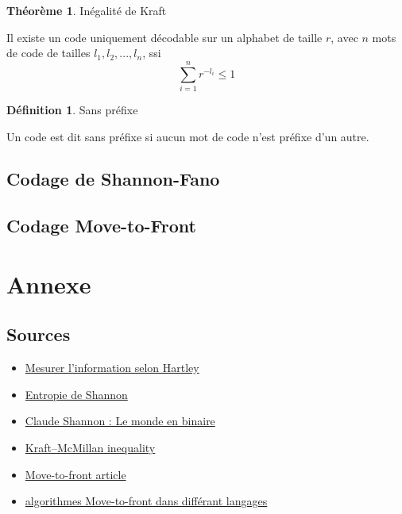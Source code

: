 \documentclass[10pt,a4paper]{article}
\theoremstyle{definition}
\newtheorem{theorem}{Théorème}
\newtheorem{definition}{Définition}
\numberwithin{lemma}{subsection}
\numberwithin{theorem}{subsection}
\numberwithin{definition}{subsection}
\numberwithin{proposition}{subsection}
\numberwithin{corollary}{subsection}
\numberwithin{property}{subsection}
\numberwithin{example}{subsection}
\numberwithin{heuristique}{subsection}
\numberwithin{scenario}{subsection}
\begin{document}
\begin{theorem}{Inégalité de Kraft}
\par Il existe un code uniquement décodable sur un alphabet de taille $r$, avec $n$ mots de code de tailles $l_1, l_2, ..., l_n$, ssi $$\sum_{i=1}^n r^{-l_i} \leqslant 1$$
\end{theorem}

\begin{definition}{Sans préfixe}
\par Un code est dit sans préfixe si aucun mot de code n'est préfixe d'un autre.
\end{definition}

	\subsection{Codage de Shannon-Fano}
	
	\subsection{Codage Move-to-Front}
	
	    

\section*{Annexe}
\subsection*{Sources}
\begin{itemize}
\item \href{https://www.sciencepresse.qc.ca/blogue/2014/12/24/mesurer-linformation-selon-hartley}{Mesurer l'information selon Hartley}
\item \href{https://fr.wikipedia.org/wiki/Entropie_de_Shannon}{Entropie de Shannon}
\item \href{https://centenaire-shannon.cnrs.fr/chapter/la-theorie-de-information}{Claude Shannon : Le monde en binaire}
\item \href{https://en.wikipedia.org/wiki/Kraft\%E2\%80\%93McMillan_inequality}{Kraft–McMillan inequality}
\item \href{https://en.wikipedia.org/wiki/Move-to-front_transform}{Move-to-front article}
\item \href{https://rosettacode.org/wiki/Move-to-front_algorithm}{algorithmes Move-to-front dans différant langages}
\end{itemize}
\end{document}
